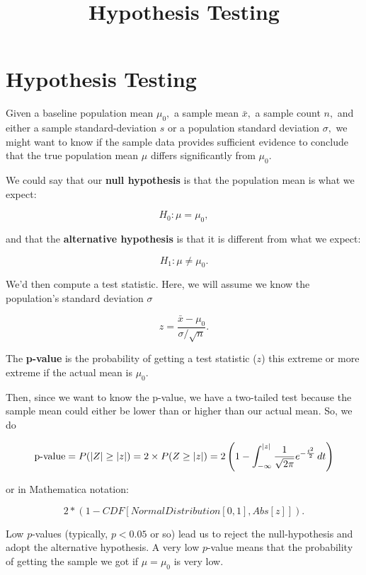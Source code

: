 \documentclass{article}
\title{Hypothesis Testing}
\begin{document}
\section{Hypothesis Testing}

Given a baseline population mean $\mu_0,$ a sample mean $\bar{x},$ a sample count $n,$ and either a sample \@{standard-deviation} $s$ or a population standard deviation $\sigma,$ we might want to know if the sample data provides sufficient evidence to conclude that the true population mean $\mu$ differs significantly from $\mu_0.$

\begin{definition}\label{null-alternative-hypothesis}
We could say that our \textbf{null hypothesis} is that the population mean is what we expect:

\[ H_0: \mu = \mu_0, \]

and that the \textbf{alternative hypothesis} is that it is different from what we expect:

\[ H_1: \mu \neq \mu_0. \]
\end{definition}

We'd then compute a test statistic. Here, we will assume we know the population's \@{standard deviation} $\sigma$

\[ z = \frac{\bar{x} - \mu_0}{\sigma / \sqrt{n}}. \]

\begin{definition}[p-value]\label{p-value}
The \textbf{p-value} is the \@{probability} of getting a test statistic ($z$) this extreme or more extreme if the actual mean is $\mu_0.$
\end{definition}

Then, since we want to know the \@{p-value}, we have a two-tailed test because the sample mean could either be lower than or higher than our actual mean. So, we do

\[ \text{p-value} = P(\left| Z \right| \geq \left| z \right|) = 2 \times P(Z \geq \left| z \right|) = 2 \left(1 - \int_{-\infty}^{\left| z \right|} \frac{1}{\sqrt{2\pi}} e^{-\frac{t^2}{2}} \, dt\right) \]

or in Mathematica notation:

\[ 2 * (1 - CDF[NormalDistribution[0, 1], Abs[z]]). \]

Low $p$-values (typically, $p < 0.05$ or so) lead us to reject the null-hypothesis and adopt the alternative hypothesis. A very low $p$-value means that the \@{probability} of getting the sample we got if $\mu = \mu_0$ is very low.
\end{document}
